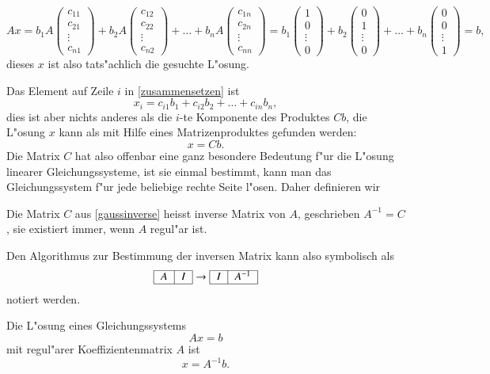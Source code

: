 \[
Ax
=
b_1A\begin{pmatrix}c_{11}\\c_{21}\\\vdots\\c_{n1}\end{pmatrix}
+
b_2A\begin{pmatrix}c_{12}\\c_{22}\\\vdots\\c_{n2}\end{pmatrix}
+\dots+
b_nA\begin{pmatrix}c_{1n}\\c_{2n}\\\vdots\\c_{nn}\end{pmatrix}
=
b_1\begin{pmatrix}1\\0\\\vdots\\0\end{pmatrix}
+
b_2\begin{pmatrix}0\\1\\\vdots\\0\end{pmatrix}
+\dots+
b_n\begin{pmatrix}0\\0\\\vdots\\1\end{pmatrix}=b,
\]
dieses $x$ ist also tats"achlich die gesuchte L"osung.

Das Element auf Zeile $i$ in 
\ref{zusammensetzen} ist
\[
x_i=c_{i1}b_1+c_{i2}b_2+\dots+c_{in}b_n,
\]
dies ist aber nichts anderes als die $i$-te Komponente des Produktes
$Cb$, die L"osung $x$ kann als mit Hilfe eines Matrizenproduktes gefunden
werden:
\[
x = Cb.
\]
Die Matrix $C$ hat also offenbar eine ganz besondere Bedeutung f"ur die
L"osung linearer Gleichungssysteme, ist sie einmal bestimmt, kann man das
Gleichungssystem f"ur jede beliebige rechte Seite l"osen.
Daher definieren wir
\begin{definition}Die Matrix $C$ aus \ref{gaussinverse} heisst inverse
Matrix von $A$, geschrieben $A^{-1}=C$, sie existiert immer, wenn $A$ regul"ar ist.
\end{definition}
Den Algorithmus zur Bestimmung der inversen Matrix kann also symbolisch
als
\begin{equation}
\begin{tabular}{|>{$}c<{$}|>{$}c<{$}|}
\hline
A&I\\
\hline
\end{tabular}
\rightarrow
\begin{tabular}{|>{$}c<{$}|>{$}c<{$}|}\hline
I&A^{-1}\\
\hline
\end{tabular}
\label{gaussinverse2}
\end{equation}
notiert werden.
\begin{satz}Die L"osung eines Gleichungssystems
\[
Ax=b
\]
mit
regul"arer Koeffizientenmatrix $A$ ist
\[
x=A^{-1}b.
\]
\end{satz}

